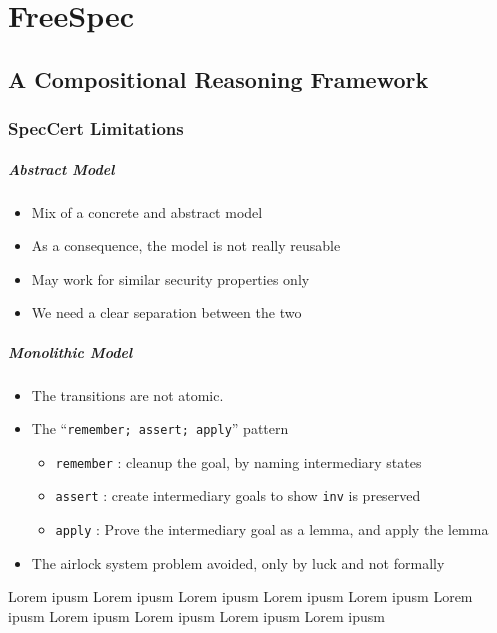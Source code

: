\documentclass[oneside,a4paper]{memoir}
\theoremstyle{break}
\begin{document}
\chapter{FreeSpec}

\section{A Compositional Reasoning Framework}

\subsection{SpecCert Limitations}

\paragraph{Abstract Model}
%
\begin{itemize}
\item Mix of a concrete and abstract model
\item As a consequence, the model is not really reusable
\item May work for similar security properties only
\item We need a clear separation between the two
\end{itemize}

\paragraph{Monolithic Model}
%
\begin{itemize}
\item The transitions are not atomic.
\item The ``\texttt{remember; assert; apply}'' pattern
  \begin{itemize}
  \item \texttt{remember} : cleanup the goal, by naming intermediary states
  \item \texttt{assert} : create intermediary goals to show \texttt{inv} is
    preserved
  \item \texttt{apply} : Prove the intermediary goal as a lemma, and apply the
    lemma
  \end{itemize}
\item The airlock system problem avoided, only by luck and not formally
\end{itemize}

Lorem ipusm Lorem ipusm Lorem ipusm Lorem ipusm Lorem ipusm Lorem ipusm Lorem
ipusm Lorem ipusm Lorem ipusm Lorem ipusm
\end{document}
